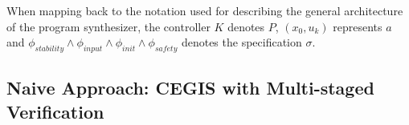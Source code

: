 \documentclass[runningheads,a4paper]{llncs}
\begin{document}
When mapping back to the notation used for describing the general
architecture of the program synthesizer, the controller $K$ denotes $P$,
$(x_0, u_k)$ represents $a$ and
$\phi_\mathit{stability} \wedge \phi_\mathit{input} \wedge
\phi_\mathit{init} \wedge \phi_\mathit{safety}$
denotes the specification $\sigma$.





\subsection{Naive Approach: CEGIS with Multi-staged Verification}
\label{sec:CEGIS-precision-incrementation}
\end{document}
